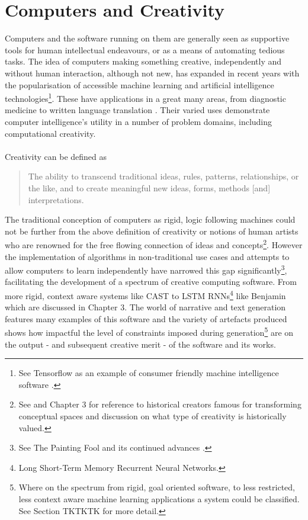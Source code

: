 \documentclass[letterpaper]{article}
\begin{document}
\section{Computers and Creativity}
Computers and the software running on them are generally seen as supportive tools for human intellectual endeavours, or  as a means of automating tedious tasks. The idea of computers making something creative, independently and without human interaction, although not new, has expanded in recent years with the popularisation of accessible machine learning and artificial intelligence technologies\footnote{See Tensorflow as an example of consumer friendly machine intelligence software .}. These have applications in a great many areas, from diagnostic medicine to written language translation . Their varied uses demonstrate computer intelligence's utility in a number of problem domains, including computational creativity.\\
\\Creativity can be defined as
\begin{quote}
The ability to transcend traditional ideas, rules, patterns, relationships, or the like, and to create meaningful new ideas, forms, methods [and] interpretations.\\
\end{quote}
The traditional conception of computers as rigid, logic following machines could not be further from the above definition of creativity or notions of human artists who are renowned for the free flowing connection of ideas and concepts\footnote{See  and Chapter 3 for reference to historical creators famous for transforming conceptual spaces and discussion on what type of creativity is historically valued.}. However the implementation of algorithms in non-traditional use cases and attempts to allow computers to learn independently have narrowed this gap significantly\footnote{See The Painting Fool and its continued advances .}, facilitating the development of a spectrum of creative computing software. From more rigid, context aware systems like CAST  to LSTM RNNs\footnote{Long Short-Term Memory Recurrent Neural Networks.} like Benjamin  which are discussed in Chapter 3. The world of narrative and text generation features many examples of this software and the variety of artefacts produced shows how impactful the level of constraints imposed during generation\footnote{Where on the spectrum from rigid, goal oriented software, to less restricted, less context aware machine learning applications a system could be classified. See Section TKTKTK for more detail.} are on the output - and subsequent creative merit - of the software and its works.\\
\end{document}
